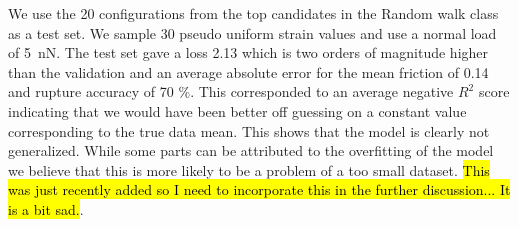We use the 20 configurations from the top candidates in the Random walk class as a test set. We sample 30 pseudo uniform strain values and use a normal load of \SI{5}{nN}. The test set gave a loss 2.13 which is two orders of magnitude higher than the validation and an average absolute error for the mean friction of 0.14 and rupture accuracy of 70 \%. This corresponded to an average negative $R^2$ score indicating that we would have been better off guessing on a constant value corresponding to the true data mean. This shows that the model is clearly not generalized. While some parts can be attributed to the overfitting of the model we believe that this is more likely to be a problem of a too small dataset. \hl{This was just recently added so I need to incorporate this in the further discussion... It is a bit sad.}. 



